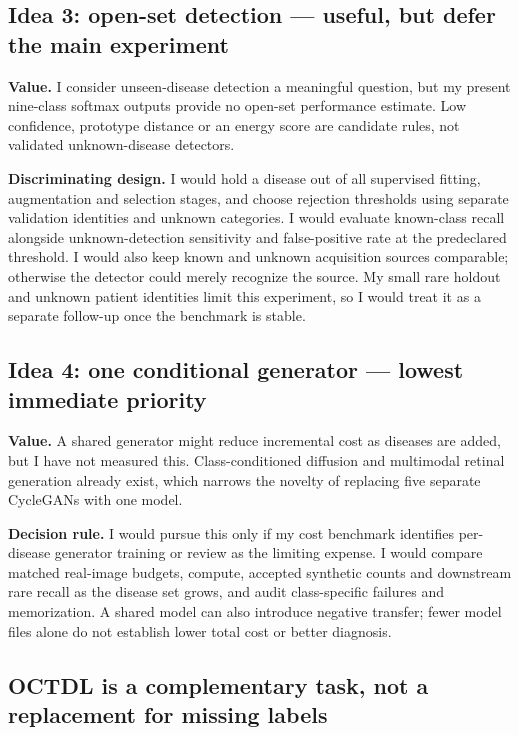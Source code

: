 \documentclass[11pt,a4paper]{article}
\begin{document}
\subsection{Idea 3: open-set detection --- useful, but defer the main experiment}

\textbf{Value.} I consider unseen-disease detection a meaningful question,
but my present nine-class softmax outputs provide no open-set performance
estimate. Low confidence, prototype distance or an energy score are candidate
rules, not validated unknown-disease detectors.

\textbf{Discriminating design.} I would hold a disease out of all supervised
fitting, augmentation and selection stages, and choose rejection thresholds
using separate validation identities and unknown categories. I would evaluate
known-class recall alongside unknown-detection sensitivity and false-positive
rate at the predeclared threshold. I would also keep known and unknown
acquisition sources comparable; otherwise the detector could merely recognize
the source. My small rare holdout and unknown patient identities limit this
experiment, so I would treat it as a separate follow-up once the benchmark is
stable.

\subsection{Idea 4: one conditional generator --- lowest immediate priority}

\textbf{Value.} A shared generator might reduce incremental cost as diseases
are added, but I have not measured this. Class-conditioned diffusion
and multimodal retinal generation already exist, which narrows the novelty
of replacing five separate CycleGANs with one model. \cite{iwanicka,eyediff}

\textbf{Decision rule.} I would pursue this only if my cost benchmark identifies
per-disease generator training or review as the limiting expense. I would
compare matched real-image budgets, compute, accepted synthetic counts and
downstream rare recall as the disease set grows, and audit class-specific
failures and memorization. A shared model can also introduce negative transfer;
fewer model files alone do not establish lower total cost or better diagnosis.

\subsection{OCTDL is a complementary task, not a replacement for missing labels}
\end{document}
